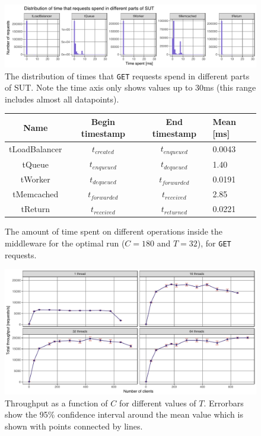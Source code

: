\documentclass[11pt]{article}
\newcommand{\get}[0]{\texttt{GET}}
\begin{document}
\begin{figure}[h]
\centering
\includegraphics[width=\textwidth]{../results/throughput/graphs/response_time_breakdown.pdf}
\caption{The distribution of times that \get{} requests spend in different parts of SUT. Note the time axis only shows values up to 30ms (this range includes almost all datapoints).}
\label{fig:exp1:res:breakdown}
\end{figure}

\begin{figure}[h]
\begin{center}
	\begin{tabular}{|c|c|c|l |}
	\hline \textbf{Name} & \textbf{Begin timestamp} & \textbf{End timestamp} & \textbf{Mean [ms]} \\
	\hline tLoadBalancer & $t_{created}$ & $t_{enqueued}$ & 0.0043 \\
	\hline tQueue & $t_{enqueued}$ & $t_{dequeued}$ & 1.40 \\
	\hline tWorker & $t_{dequeued}$ & $t_{forwarded}$ & 0.0191 \\
	\hline tMemcached & $t_{forwarded}$ & $t_{received}$ & 2.85 \\
	\hline tReturn & $t_{received}$ & $t_{returned}$ & 0.0221 \\
	\end{tabular}
	\caption{The amount of time spent on different operations inside the middleware for the optimal run ($C=180$ and $T=32$), for \get{} requests.}
	\label{fig:exp1:table}
\end{center}
\end{figure}

\begin{figure}[p]
\centering
\includegraphics[width=\textwidth]{../results/throughput/graphs/tp_vs_clients.pdf}
\caption{Throughput as a function of $C$ for different values of $T$. Errorbars show the 95\% confidence interval around the mean value which is shown with points connected by lines.}
\label{fig:exp1:res:throughput}
\end{figure}
\end{document}

